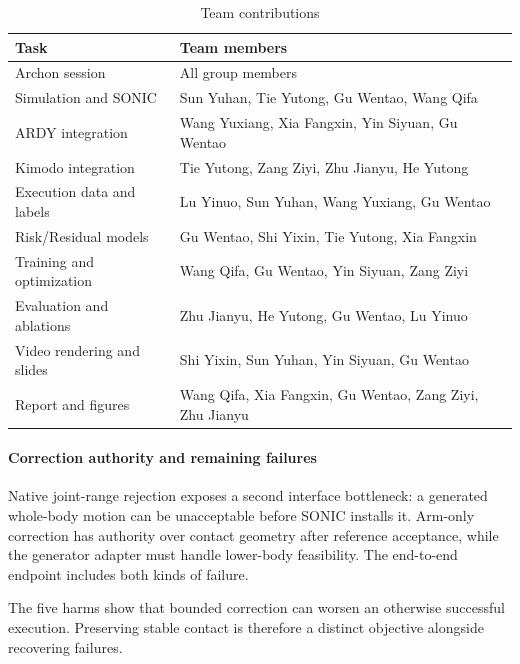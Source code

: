\documentclass[letterpaper,10pt,conference]{ieeeconf}
\begin{document}
\begin{table}[t]
\centering
\caption{Team contributions}
\label{tab:team-contributions}
\begingroup
\fontsize{9}{10.6}\selectfont
\setlength{\tabcolsep}{4pt}
\renewcommand{\arraystretch}{1.0}
\begin{tabular}{@{}p{}p{}@{}}
\toprule
Task & Team members\\
\midrule
Archon session & All group members\\
Simulation and SONIC & Sun Yuhan, Tie Yutong, Gu Wentao, Wang Qifa\\
ARDY integration & Wang Yuxiang, Xia Fangxin, Yin Siyuan, Gu Wentao\\
Kimodo integration & Tie Yutong, Zang Ziyi, Zhu Jianyu, He Yutong\\
Execution data and labels & Lu Yinuo, Sun Yuhan, Wang Yuxiang, Gu Wentao\\
Risk/Residual models & Gu Wentao, Shi Yixin, Tie Yutong, Xia Fangxin\\
Training and optimization & Wang Qifa, Gu Wentao, Yin Siyuan, Zang Ziyi\\
Evaluation and ablations & Zhu Jianyu, He Yutong, Gu Wentao, Lu Yinuo\\
Video rendering and slides & Shi Yixin, Sun Yuhan, Yin Siyuan, Gu Wentao\\
Report and figures & Wang Qifa, Xia Fangxin, Gu Wentao, Zang Ziyi, Zhu Jianyu\\
\bottomrule
\end{tabular}
\endgroup
\end{table}


\paragraph{Correction authority and remaining failures}
Native joint-range rejection exposes a second interface bottleneck: a generated whole-body motion can be unacceptable before SONIC installs it. Arm-only correction has authority over contact geometry after reference acceptance, while the generator adapter must handle lower-body feasibility. The end-to-end endpoint includes both kinds of failure.

The five harms show that bounded correction can worsen an otherwise successful execution. Preserving stable contact is therefore a distinct objective alongside recovering failures.

\newpage
\end{document}

